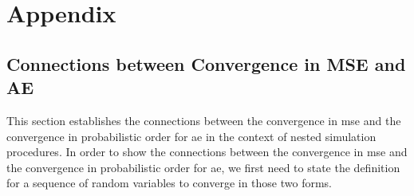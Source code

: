 \chapter*{Appendix} \label{chap:appendix}








\section{Connections between Convergence in MSE and AE}\label{appendix:connection-mse-absolute-error}

This section establishes the connections between the convergence in \gls{mse} and the convergence in probabilistic order for \gls{ae} in the context of nested simulation procedures.
In order to show the connections between the convergence in \gls{mse} and the convergence in probabilistic order for \gls{ae}, we first need to state the definition for a sequence of random variables to converge in those two forms.

